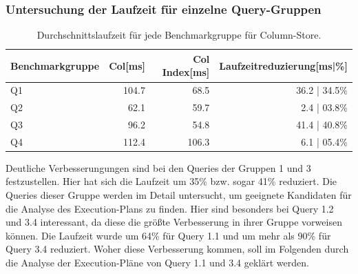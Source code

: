 \subsubsection{Untersuchung der Laufzeit für einzelne Query-Gruppen}

\begin{table}[H]
    \centering
    \begin{tabularx}{14cm}{lrrr}
        \toprule
        Benchmarkgruppe & Col[ms]   & Col Index[ms] & Laufzeitreduzierung[ms|\%]\\
        \toprule
        Q1              & 104.7       & 68.5            & 36.2 | 34.5\%\\
        Q2              & 62.1        & 59.7            & 2.4 |  03.8\%\\
        Q3              & 96.2        & 54.8            & 41.4 | 40.8\%\\
        Q4              & 112.4       & 106.3           & 6.1 |  05.4\%\\
        \bottomrule
    \end{tabularx}
	\caption{Durchschnittslaufzeit für jede Benchmarkgruppe für Column-Store.}
\end{table}

Deutliche Verbesserungungen sind bei den Queries der Gruppen 1 und 3 festzustellen. Hier hat sich die Laufzeit um 35\% bzw. sogar 41\% reduziert. 
Die Queries dieser Gruppe werden im Detail untersucht, um geeignete Kandidaten für die Analyse des Execution-Plans zu finden.
Hier sind besonders bei Query 1.2 und 3.4 interessant, da diese die größte Verbesserung in ihrer Gruppe vorweisen können. 
Die Laufzeit wurde um 64\% für Query 1.1 und um mehr als 90\% für Query 3.4 reduziert. Woher diese Verbesserung kommen, soll im Folgenden durch die Analyse der Execution-Pläne von Query 1.1 und 3.4 geklärt werden.


